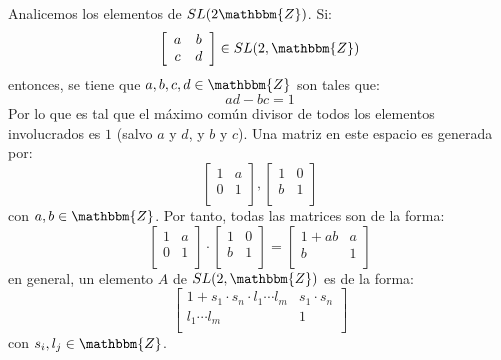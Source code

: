 \documentclass[12pt]{report}
\theoremstyle{largebreak}
\newcommand{\bbm}[1]{\ensuremath{\mathbbm{#1}}}
\begin{document}
    \begin{obs}
        Analicemos los elementos de $SL(2\bbm{Z})$. Si:
        \begin{equation*}
            \left[\begin{array}{cc}
                a & b \\
                c & d \\
            \end{array} \right]\in SL(2,\bbm{Z})
        \end{equation*}
        entonces, se tiene que $a,b,c,d\in\bbm{Z}$ son tales que:
        \begin{equation*}
            ad-bc=1
        \end{equation*}
        Por lo que es tal que el máximo común divisor de todos los elementos involucrados es $1$ (salvo $a$ y $d$, y $b$ y $c$). Una matriz en este espacio es generada por:
        \begin{equation*}
            \left[\begin{array}{cc}
                1 & a \\
                0 & 1 \\
            \end{array} \right],\left[\begin{array}{cc}
                1 & 0 \\
                b & 1 \\
            \end{array} \right]
        \end{equation*}
        con $a,b\in\bbm{Z}$. Por tanto, todas las matrices son de la forma:
        \begin{equation*}
            \left[\begin{array}{cc}
                1 & a \\
                0 & 1 \\
            \end{array} \right]\cdot \left[\begin{array}{cc}
                1 & 0 \\
                b & 1 \\
            \end{array} \right]=\left[\begin{array}{cc}
                1+ab & a \\
                b & 1 \\
            \end{array} \right]
        \end{equation*}
        en general, un elemento $A$ de $SL(2,\bbm{Z})$ es de la forma:
        \begin{equation*}
            \left[\begin{array}{cc}
                1+s_1\cdot s_n\cdot l_1\cdots l_m & s_1\cdot s_n \\
                l_1\cdots l_m & 1 \\
            \end{array} \right]
        \end{equation*}
        con $s_i,l_j\in\bbm{Z}$.
    \end{obs}
\end{document}
